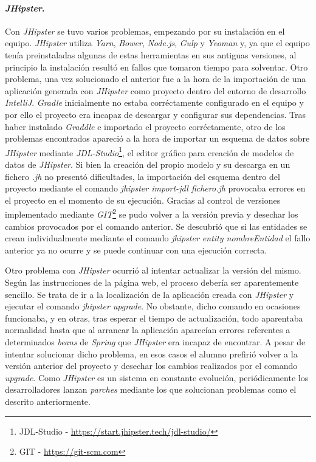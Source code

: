 \paragraph*{\textit{JHipster}.} Con \textit{JHipster} se tuvo varios problemas, empezando por su instalación en el equipo. \textit{JHipster} utiliza \textit{Yarn}, \textit{Bower}, \textit{Node.js}, \textit{Gulp} y \textit{Yeoman} y, ya que el equipo tenía preinstaladas algunas de estas herramientas en sus antiguas versiones, al principio la instalación resultó en fallos que tomaron tiempo para solventar. Otro problema, una vez solucionado el anterior fue a la hora de la importación de una aplicación generada con \textit{JHipster} como proyecto dentro del entorno de desarrollo \textit{IntelliJ}. \textit{Gradle} inicialmente no estaba corréctamente configurado en el equipo y por ello el proyecto era incapaz de descargar y configurar sus dependencias. Tras haber instalado \textit{Graddle} e importado el proyecto corréctamente, otro de los problemas encontrados apareció a la hora de importar un esquema de datos sobre \textit{JHipster} mediante \textit{JDL-Studio}\footnote{JDL-Studio - \url{https://start.jhipster.tech/jdl-studio/}}, el editor gráfico para creación de modelos de datos de \textit{JHipster}. Si bien la creación del propio modelo y su descarga en un fichero  \textit{.jh} no presentó dificultades, la importación del esquema dentro del proyecto mediante el comando \textit{jhipster import-jdl fichero.jh} provocaba errores en el proyecto en el momento de su ejecución. Gracias al control de versiones implementado mediante \textit{GIT}\footnote{GIT - \url{https://git-scm.com}} se pudo volver a la versión previa y desechar los cambios provocados por el comando anterior. Se descubrió que si las entidades se crean individualmente mediante el comando \textit{jhipster entity nombreEntidad} el fallo anterior ya no ocurre y se puede continuar con una ejecución correcta. 
\par 
Otro problema con \textit{JHipster} ocurrió al intentar actualizar la versión del mismo. Según las instrucciones de la página web, el proceso debería ser aparentemente sencillo. Se trata de ir a la localización de la aplicación creada con \textit{JHipster} y ejecutar el comando \textit{jhipster upgrade}. No obstante, dicho comando en ocasiones funcionaba, y en otras, tras esperar el tiempo de actualización, todo aparentaba normalidad hasta que al arrancar la aplicación aparecían errores referentes a determinados \textit{beans} de \textit{Spring} que \textit{JHipster} era incapaz de encontrar. A pesar de intentar solucionar dicho problema, en esos casos el alumno prefirió volver a la versión anterior del proyecto y desechar los cambios realizados por el comando \textit{upgrade}. Como \textit{JHipster} es un sistema en constante evolución, periódicamente los desarrolladores lanzan \textit{parches} mediante los que solucionan problemas como el descrito anteriormente. 

